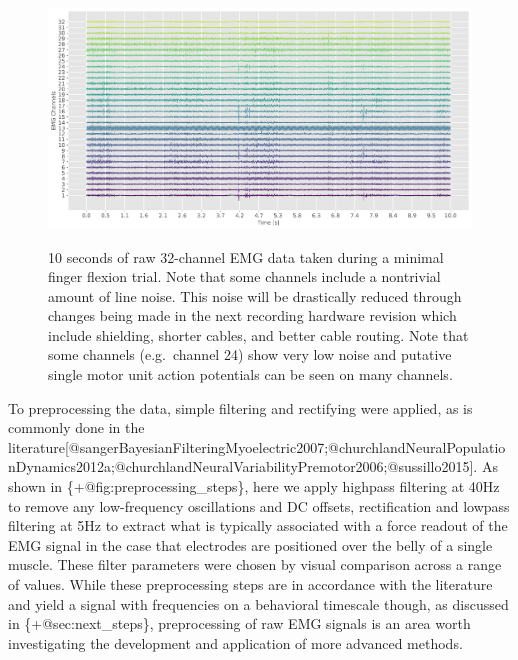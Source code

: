 \begin{figure}
\label{fig:raw_data}
\centering
\includegraphics[width=1\textwidth,height=\textheight]{images/data_analysis/fingers/raw_data.pdf}
\caption{10 seconds of raw 32-channel EMG data taken during a minimal
finger flexion trial. Note that some channels include a nontrivial
amount of line noise. This noise will be drastically reduced through
changes being made in the next recording hardware revision which include
shielding, shorter cables, and better cable routing. Note that some
channels (e.g.~channel 24) show very low noise and putative single motor
unit action potentials can be seen on many
channels.}\label{fig:raw_data}
\end{figure}

To preprocessing the data, simple filtering and rectifying were applied,
as is commonly done in the
literature{[}@sangerBayesianFilteringMyoelectric2007;@churchlandNeuralPopulationDynamics2012a;@churchlandNeuralVariabilityPremotor2006;@sussillo2015{]}.
As shown in \{+@fig:preprocessing\_steps\}, here we apply highpass
filtering at 40Hz to remove any low-frequency oscillations and DC
offsets, rectification and lowpass filtering at 5Hz to extract what is
typically associated with a force readout of the EMG signal in the case
that electrodes are positioned over the belly of a single muscle. These
filter parameters were chosen by visual comparison across a range of
values. While these preprocessing steps are in accordance with the
literature and yield a signal with frequencies on a behavioral timescale
though, as discussed in \{+@sec:next\_steps\}, preprocessing of raw EMG
signals is an area worth investigating the development and application
of more advanced methods.

